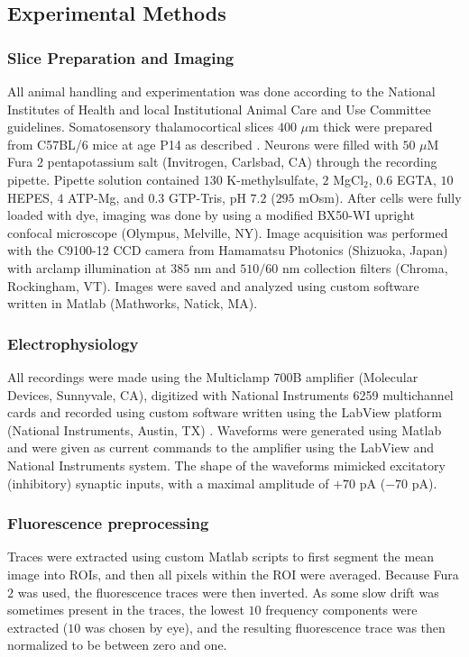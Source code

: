 \subsection{Experimental Methods} \label{sec:exp}

\subsubsection{Slice Preparation and Imaging}

All animal handling and experimentation was done according to the National Institutes of Health and local Institutional Animal Care and Use Committee guidelines. Somatosensory thalamocortical slices $400$ $\mu$m thick were prepared from C57BL/6 mice at age P14 as described \cite{MacLeanYuste05}. Neurons were filled with $50$ $\mu$M Fura $2$ pentapotassium salt (Invitrogen, Carlsbad, CA) through the recording pipette. Pipette solution contained $130$ K-methylsulfate, $2$ MgCl$_2$, $0.6$ EGTA, $10$ HEPES, $4$ ATP-Mg, and $0.3$ GTP-Tris, pH $7.2$ ($295$ mOsm).  After cells were fully loaded with dye, imaging was done by using a modified BX50-WI upright confocal microscope (Olympus, Melville, NY).  Image acquisition was performed with the C9100-12 CCD camera from Hamamatsu Photonics (Shizuoka, Japan) with arclamp illumination at $385$ nm and $510/60$ nm collection filters (Chroma, Rockingham, VT).  Images were saved and analyzed using custom software written in Matlab (Mathworks, Natick, MA).

\subsubsection{Electrophysiology}

All recordings were made using the Multiclamp 700B amplifier (Molecular Devices, Sunnyvale, CA), digitized with National Instruments 6259 multichannel cards and recorded using custom software written using the LabView platform (National Instruments, Austin, TX) .  Waveforms were generated using Matlab and were given as current commands to the amplifier using the LabView and National Instruments system. The shape of the waveforms mimicked excitatory (inhibitory) synaptic inputs, with a maximal amplitude of $+70$ pA ($-70$ pA).

\subsubsection{Fluorescence preprocessing}

Traces were extracted using custom Matlab scripts to first segment the mean image into ROIs, and then all pixels within the ROI were averaged.  Because Fura $2$ was used, the fluorescence traces were then inverted.  As some slow drift was sometimes present in the traces, the lowest $10$ frequency components were extracted ($10$ was chosen by eye), and the resulting fluorescence trace was then normalized to be between zero and one.









